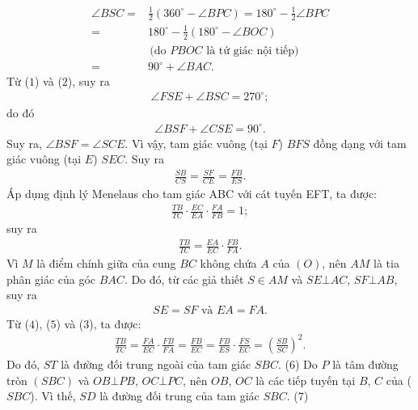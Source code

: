 \begin{multicols}{2}
	\begin{align*}
		\angle BSC = &\frac{1}{2}\!\left({{{360}^{\circ}} \!-\! \angle BPC} \right) \!=\! {180^{\circ}} \!-\! \frac{1}{2}\angle BPC\\[-0.5ex]
		= \,&{180^{\circ}} - \frac{1}{2}\left( {{{180}^{\circ}} - \angle BOC} \right)\\[-0.5ex]
		&\,\text{(do $PBOC$ là tứ giác nội tiếp)}\\[-0.5ex]
		= \,&{90^{\circ}} + \angle BAC. \tag{$2$}
	\end{align*}
	Từ ($1$) và ($2$), suy ra
	\begin{align*}
		\angle FSE + \angle BSC = {270^{\circ}};
	\end{align*}
	do đó
	\begin{align*}
		\angle BSF + \angle CSE = {90^{\circ}}.
	\end{align*}
	Suy ra,  $\angle BSF = \angle SCE$. Vì vậy, tam giác vuông (tại $F$) $BFS$ đồng dạng với tam giác vuông (tại $E$) $SEC$. Suy ra
	\begin{align*}
		\frac{{SB}}{{CS}} = \frac{{SF}}{{CE}} = \frac{{FB}}{{ES}}. \tag{$3$}
	\end{align*}
	Áp dụng định lý Menelaus cho tam giác ABC với cát tuyến EFT, ta được:
	\begin{align*}
		\frac{{TB}}{{TC}} \cdot \frac{{EC}}{{EA}} \cdot \frac{{FA}}{{FB}} = 1;
	\end{align*}
	suy ra
	\begin{align*}
		\frac{{TB}}{{TC}} = \frac{{EA}}{{EC}} \cdot \frac{{FB}}{{FA}}. \tag{$4$}
	\end{align*}
	Vì $M$ là điểm chính giữa của cung $BC$ không chứa $A$ của $(O)$, nên $AM$ là tia phân giác của góc $BAC$. Do đó, từ các giả thiết $S \in AM$ và $SE \bot AC$, $SF \bot AB$, suy ra
	\begin{align*}
		SE = SF \text{ và } EA = FA.  \tag{$5$}
	\end{align*} 
	Từ ($4$), ($5$) và ($3$), ta được:
	\begin{align*}
		\frac{{TB}}{{TC}} \!=\! \frac{{FA}}{{EC}} \!\cdot\! \frac{{FB}}{{FA}} \!=\! \frac{{FB}}{{EC}} \!=\! \frac{{FB}}{{ES}} \!\cdot\! \frac{{FS}}{{EC}} \!=\! {\left( {\frac{{SB}}{{SC}}} \right)^2}.
	\end{align*}
	Do đó, $ST$ là đường đối trung ngoài của tam giác $SBC$. \hfill ($6$)
	\vskip 0.05cm
	Do $P$ là tâm đường tròn $(SBC)$ và $OB \bot PB$, $OC \bot PC$, nên $OB$, $OC$ là các tiếp tuyến tại $B$, $C$ của ($SBC$). Vì thế, $SD$ là đường đối trung của tam giác $SBC$. \hfill ($7$)
	\vskip 0.05cm

\end{multicols}
